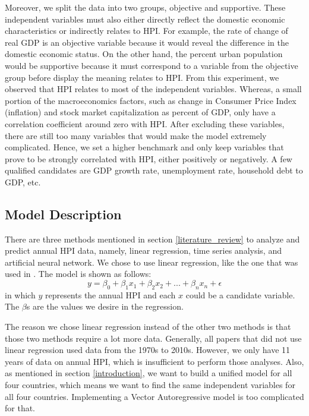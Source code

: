 \documentclass[11pt]{article}
\begin{document}
Moreover, we split the data into two groups, objective and supportive. These independent variables must also either directly reflect the domestic economic characteristics or indirectly relates to HPI. For example, the rate of change of real GDP is an objective variable because it would reveal the difference in the domestic economic status. On the other hand, the percent urban population would be supportive because it must correspond to a variable from the objective group before display the meaning relates to HPI. From this experiment, we observed that HPI relates to most of the independent variables. Whereas, a small portion of the macroeconomics factors, such as change in Consumer Price Index (inflation) and stock market capitalization as percent of GDP, only have a correlation coefficient around zero with HPI. After excluding these variables, there are still too many variables that would make the model extremely complicated. Hence, we set a higher benchmark and only keep variables that prove to be strongly correlated with HPI, either positively or negatively. A few qualified candidates are GDP growth rate, unemployment rate, household debt to GDP, etc. 


\subsection{Model Description}\label{model_description}
There are three methods mentioned in section \ref{literature_review} to analyze and predict annual HPI data, namely, linear regression, time series analysis, and artificial neural network. We chose to use linear regression, like the one that was used in \citet{GASPARENIENE2016122}. The model is shown as follows:
$$y = \beta_0 + \beta_1x_1 + \beta_2x_2 + ... + \beta_nx_n + \epsilon$$
in which $y$ represents the annual HPI and each $x$ could be a candidate variable. The $\beta$s are the values we desire in the regression.

The reason we chose linear regression instead of the other two methods is that those two methods require a lot more data. Generally, all papers that did not use linear regression used data from the 1970s to 2010s. However, we only have 11 years of data on annual HPI, which is insufficient to perform those analyses. Also, as mentioned in section \ref{introduction}, we want to build a unified model for all four countries, which means we want to find the same independent variables for all four countries. Implementing a Vector Autoregressive model is too complicated for that.
\end{document}
